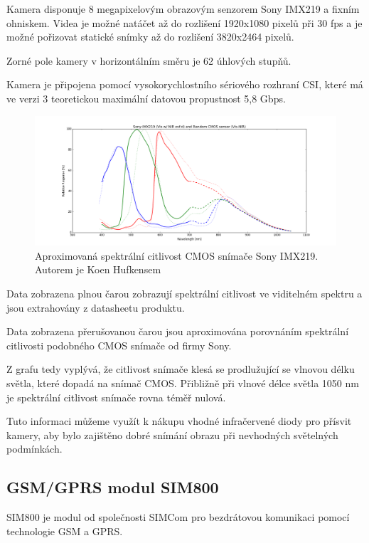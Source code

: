 Kamera disponuje 8 megapixelovým obrazovým senzorem Sony IMX219 a fixním ohniskem. Videa je možné natáčet až do rozlišení 1920x1080 pixelů při 30 fps a je možné pořizovat statické snímky až do rozlišení 3820x2464 pixelů.

Zorné pole kamery v horizontálním směru je 62 úhlových stupňů.

Kamera je připojena pomocí vysokorychlostního sériového rozhraní CSI, které má ve verzi 3 teoretickou maximální datovou propustnost 5,8 Gbps.

\begin{figure}[!h]
  \begin{center}
    \includegraphics[scale=0.32]{obrazky/SonyIMX219approx.png}
  \end{center}
  \caption{Aproximovaná spektrální citlivost CMOS snímače Sony IMX219. Autorem je Koen Hufkensem  \cite{sony}}
\end{figure} 
Data zobrazena plnou čarou zobrazují spektrální citlivost ve viditelném spektru a jsou extrahovány z datasheetu produktu.

Data zobrazena přerušovanou čarou jsou aproximována porovnáním spektrální citlivosti podobného CMOS snímače od firmy Sony.

Z grafu tedy vyplývá, že citlivost snímače klesá se prodlužující se vlnovou délku světla, které dopadá na snímač CMOS. Přibližně při vlnové délce světla 1050 nm je spektrální citlivost snímače rovna téměř nulová.

Tuto informaci můžeme využít k nákupu vhodné infračervené diody pro přísvit kamery, aby bylo zajištěno dobré snímání obrazu při nevhodných světelných podmínkách.

\subsection*{GSM/GPRS modul SIM800}
SIM800 je modul od společnosti SIMCom pro bezdrátovou komunikaci pomocí technologie GSM a GPRS.

